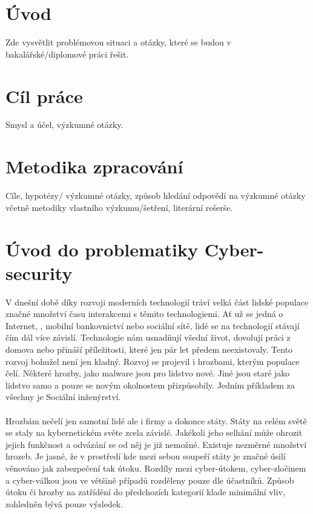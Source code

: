 \section{Úvod}\label{sec:uvod}


Zde vysvětlit problémovou situaci a otázky, které se budou v bakalářské/diplomové práci řešit.

\section{Cíl práce}\label{sec:cil-prace}


Smysl a účel, výzkumné otázky.

\section{Metodika zpracování}\label{sec:metodika-zpracovani}


Cíle, hypotézy/ výzkumné otázky, způsob hledání odpovědí na výzkumné otázky včetně metodiky vlastního výzkumu/šetření, literární rešerše.

\section{Úvod do problematiky Cyber-security}
V dnešní době díky rozvoji moderních technologií tráví velká část lidské populace značné množství času interakcemi s těmito technologiemi.
Ať už se jedná o Internet, , mobilní bankovnictví nebo sociální sítě, lidé se na technologií stávají čím dál více závislí.
Technologie nám usnadňují všední život, dovolují práci z domova nebo přináší příležitosti, které jen pár let předem neexistovaly.
Tento rozvoj bohužel není jen kladný.
Rozvoj se projevil i hrozbami, kterým populace čelí.
Některé hrozby, jako malware jsou pro lidstvo nové.
Jiné jsou staré jako lidstvo samo a pouze se novým okolnostem přizpůsobily.
Jedním příkladem za všechny je Sociální inženýrství.

\paragraph{}
Hrozbám nečelí jen samotní lidé ale i firmy a dokonce státy.
Státy na celém světě se staly na kybernetickém světe zcela závislé.\cite{LI20218176}
Jakékoli jeho selhání může ohrozit jejich funkčnost a odvázání se od něj je již nemožné.
Existuje nezměrné množství hrozeb.
Je jasné, že v prostředí kde mezi sebou soupeří státy je značné úsilí věnováno jak zabezpečení tak útoku.
Rozdíly mezi cyber-útokem, cyber-zločinem a cyber-válkou jsou ve většině případů rozděleny pouze dle účastníků.\cite{LI20218176}
Způsob útoku či hrozby na zatřídění do předchozích kategorií klade minimální vliv, zohledněn bývá pouze výsledek.



